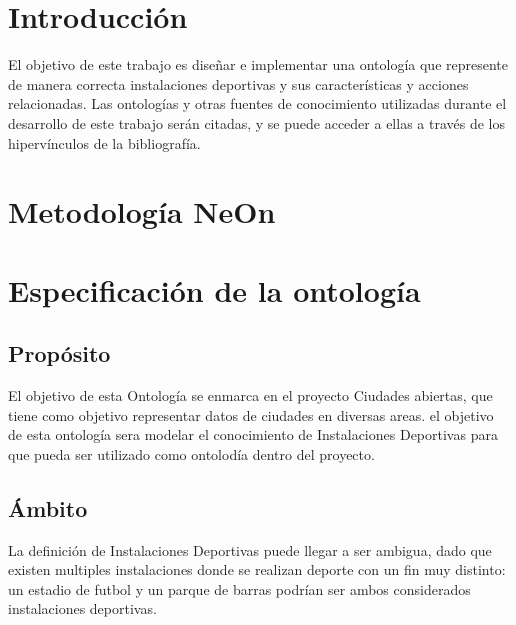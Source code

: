 \documentclass[a4paper,12pt]{article}
\begin{document}
	
	\setlength{\parindent}{0.5cm}
	\setlength{\voffset}{-2cm}
	\setlength{\hoffset}{-2cm}
	
	
	
	\tableofcontents
	
\newpage

	\section{Introducción}
	
	El objetivo de este trabajo es diseñar e implementar una ontología que represente de manera correcta instalaciones deportivas y sus características y acciones relacionadas. Las ontologías y otras fuentes de conocimiento utilizadas durante el desarrollo de este trabajo serán citadas, y se puede acceder a ellas a través de los hipervínculos de la bibliografía.
	
	\section{Metodología NeOn}
	
	\section{Especificación de la ontología}
	
	\subsection{Propósito}
	El objetivo de esta Ontología se enmarca en el proyecto Ciudades abiertas, que tiene como objetivo representar datos de ciudades en diversas areas. el objetivo de esta ontología sera modelar el conocimiento de Instalaciones Deportivas para que pueda ser utilizado como ontolodía dentro del proyecto.
	
	\subsection{Ámbito}
	La definición de Instalaciones Deportivas puede llegar a ser ambigua, dado que existen multiples instalaciones donde se realizan deporte con un fin muy distinto: un estadio de futbol y un parque de barras podrían ser ambos considerados instalaciones deportivas.
	
\end{document}
